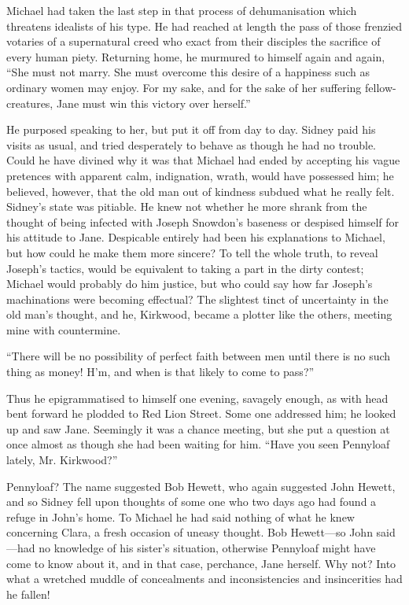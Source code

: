 Michael had taken the last step in that process of dehumanisation which
threatens idealists of his type. He had reached at length the pass of
those frenzied votaries of a supernatural creed who exact from their
disciples the sacrifice of every human piety. Returning home, he
murmured to himself again and again, ``She must not marry. She must
overcome this desire of a happiness such as ordinary women may enjoy.
For my sake, and for the sake of her suffering fellow-creatures, Jane
must win this victory over herself.''

He purposed speaking to her, but put it off from day to day. Sidney paid
his visits as usual, and tried desperately to behave as though he had no
trouble. Could he have divined why it was that Michael had ended by
accepting his vague pretences with apparent calm, indignation, wrath,
would have possessed him; he believed, however, that the old man out of
kindness subdued what he really felt. Sidney's state was pitiable. He
knew not whether {}he more shrank from the thought of being infected
with Joseph Snowdon's baseness or despised himself for his attitude to
Jane. Despicable entirely had been his explanations to Michael, but how
could he make them more sincere? To tell the whole truth, to reveal
Joseph's tactics, would be equivalent to taking a part in the dirty
contest; Michael would probably do him justice, but who could say how
far Joseph's machinations were becoming effectual? The slightest tinct
of uncertainty in the old man's thought, and he, Kirkwood, became a
plotter like the others, meeting mine with countermine.

``There will be no possibility of perfect faith between men until there
is no such thing as money! H'm, and when is that likely to come to
pass?''

Thus he epigrammatised to himself one evening, savagely enough, as with
head bent forward he plodded to Red Lion Street. Some one addressed him;
he looked up and saw Jane. Seemingly it was a chance meeting, but she
put a question at once almost as though she had been waiting for him.
``Have you seen Pennyloaf lately, Mr. Kirkwood?''

{}Pennyloaf? The name suggested Bob Hewett, who again suggested John
Hewett, and so Sidney fell upon thoughts of some one who two days ago
had found a refuge in John's home. To Michael he had said nothing of
what he knew concerning Clara, a fresh occasion of uneasy thought. Bob
Hewett---so John said---had no knowledge of his sister's situation,
otherwise Pennyloaf might have come to know about it, and in that case,
perchance, Jane herself. Why not? Into what a wretched muddle of
concealments and inconsistencies and insincerities had he fallen!

